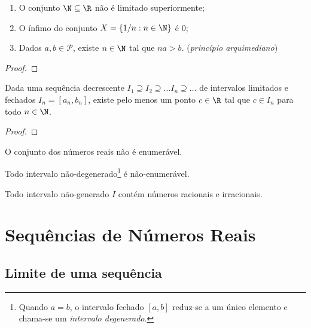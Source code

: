 \documentclass{article}
\begin{document}
\begin{thm} 
    \begin{enumerate}
        \item [(i)] O conjunto \(\N \subseteq \R\) não é limitado superiormente;
        \item [(ii)] O ínfimo do conjunto \(X = \{1/n : n \in \N\}\) é \(0\);
        \item [(iii)] Dados \(a, b \in \mathcal{P}\), existe \(n \in \N\) tal que \(na > b\). \hfill (\emph{princípio arquimediano})
    \end{enumerate}
\end{thm}

\begin{proof}
    
\end{proof}

\begin{thm} 
    Dada uma sequência decrescente \(I_1 \supseteq I_2 \supseteq \ldots I_n \supseteq \ldots\) de intervalos limitados e fechados \(I_n = [a_n, b_n]\), existe pelo menos um ponto \(c \in \R\) tal que \(c \in I_n\) para todo \(n \in \N\).
\end{thm}

\begin{proof}
    
\end{proof}

\begin{thm}
    O conjunto dos números reais não é enumerável.
\end{thm}

\begin{cor}
    Todo intervalo não-degenerado\footnote{Quando \(a=b\), o intervalo fechado \([a,b]\) reduz-se a um único elemento e chama-se um \emph{intervalo degenerado}.} é não-enumerável.
\end{cor}

\begin{prop}
    Todo intervalo não-generado \(I\) contém números racionais e irracionais.
\end{prop}

\section{Sequências de Números Reais}

\subsection{Limite de uma sequência}
\end{document}
